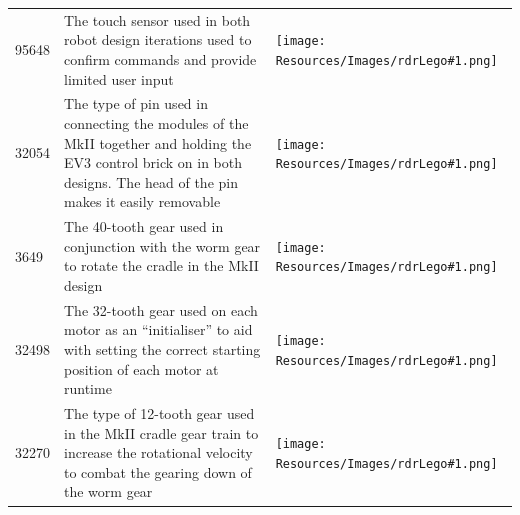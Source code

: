 \documentclass{report}
\newcommand{\legoindeximage}[1]{\texttt{[image: Resources/Images/rdrLego\#1.png]}}
\begin{document}
\begin{appendices}
\begin{center}
\begin{longtable}{M{0.15\textwidth}m{0.3\textwidth}M{0.3\textwidth}}
				95648	&	The touch sensor used in both robot design iterations used to confirm commands and provide limited user input	& \legoindeximage{95648} \\
				32054	&	The type of pin	used in connecting the modules of the MkII together and holding the EV3 control brick on in both designs. The head of the pin makes it easily removable & \legoindeximage{32054} \\
				3649	&	The 40-tooth gear used in conjunction with the worm gear to rotate the cradle in the MkII design	& \legoindeximage{3649} \\
				32498	&	The 32-tooth gear used on each motor as an \enquote{initialiser} to aid with setting the correct starting position of each motor at runtime	& \legoindeximage{32498} \\
				32270	&	The type of 12-tooth gear used in the MkII cradle gear train to increase the rotational velocity to combat the gearing down of the worm gear	& \legoindeximage{32270} \\
			\end{longtable}
		\end{center}
		

\end{appendices}
\end{document}
